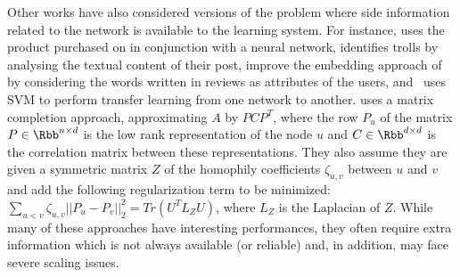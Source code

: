 \bigskip

Other works have also\done{}
considered versions of the problem where side information related to the network is available to
the learning system. For instance, \autocite{EdgeSignsRating15} uses the product purchased on
\epi{} in conjunction with a neural network, \autocite{TrollDetection15} identifies trolls by
analysing the textual content of their post, \autocite{attributedSNE17} improve
the embedding approach of \textcite{neuralSigned17} by considering the words
written in reviews as attributes of the users,  and~\autocite{SNTransfer13} uses SVM to perform
transfer learning from one network to another.
\autocite{Tang2013} uses a matrix completion approach, approximating $A$ by $PCP^T$, where the
row $P_u$ of the matrix $P\in\Rbb^{n\times d}$ is the low rank representation of the node $u$ and
$C\in\Rbb^{d\times d}$ is the correlation matrix between these representations. They also assume
they are given a symmetric matrix $Z$ of the homophily coefficients $\zeta_{u,v}$ between $u$ and
$v$ and add the following regularization term to be minimized: $\sum_{u<v} \zeta_{u,v}||P_u -
P_v||_2^2 = Tr(U^T L_Z U)$, where $L_Z$ is the Laplacian of $Z$.
While many of these approaches have interesting
performances, they often require extra information which is not always available (or reliable) and,
in addition, may face severe scaling issues.

\medskip

